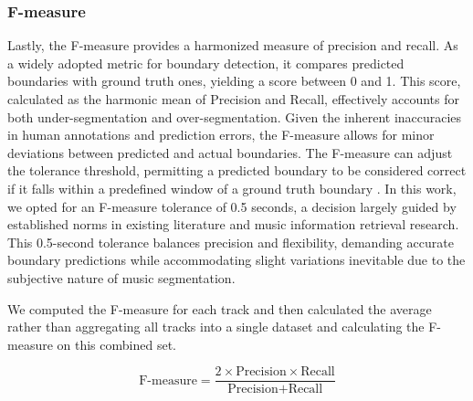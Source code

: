 \subsubsection{F-measure}

Lastly, the F-measure provides a harmonized measure of precision and recall. As a widely adopted metric for boundary detection, it compares predicted boundaries with ground truth ones, yielding a score between 0 and 1. This score, calculated as the harmonic mean of Precision and Recall, effectively accounts for both under-segmentation and over-segmentation. Given the inherent inaccuracies in human annotations and prediction errors, the F-measure allows for minor deviations between predicted and actual boundaries. The F-measure can adjust the tolerance threshold, permitting a predicted boundary to be considered correct if it falls within a predefined window of a ground truth boundary \cite{NietoPerceptualMusic, Turnbull2007ABOOSTING}. In this work, we opted for an F-measure tolerance of 0.5 seconds, a decision largely guided by established norms in existing literature and music information retrieval research. This 0.5-second tolerance balances precision and flexibility, demanding accurate boundary predictions while accommodating slight variations inevitable due to the subjective nature of music segmentation.

We computed the F-measure for each track and then calculated the average rather than aggregating all tracks into a single dataset and calculating the F-measure on this combined set.

\begin{equation}
\text{F-measure} = \frac{2 \times \text{Precision} \times \text{Recall}}{\text{Precision} + \text{Recall}}
\end{equation}

\newpage